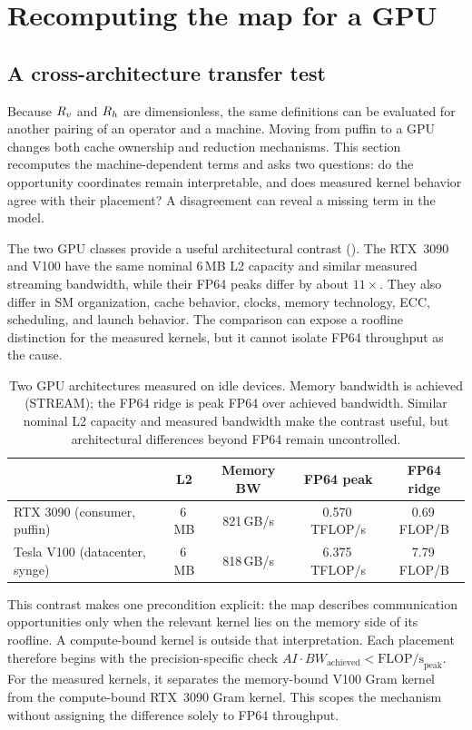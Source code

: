 \section{Recomputing the map for a GPU}\label{sec:gpu}

\subsection{A cross-architecture transfer test}

Because $R_v$ and $R_h$ are dimensionless, the same definitions can be evaluated for another pairing of an operator and a machine. Moving from puffin to a GPU changes both cache ownership and reduction mechanisms. This section recomputes the machine-dependent terms and asks two questions: do the opportunity coordinates remain interpretable, and does measured kernel behavior agree with their placement? A disagreement can reveal a missing term in the model.

The two GPU classes provide a useful architectural contrast (). The RTX~3090 and V100 have the same nominal 6\,MB L2 capacity and similar measured streaming bandwidth, while their FP64 peaks differ by about $11\times$. They also differ in SM organization, cache behavior, clocks, memory technology, ECC, scheduling, and launch behavior. The comparison can expose a roofline distinction for the measured kernels, but it cannot isolate FP64 throughput as the cause.

\begin{table}[htbp!]
\centering
\caption{Two GPU architectures measured on idle devices. Memory bandwidth is achieved (STREAM); the FP64 ridge is peak FP64 over achieved bandwidth. Similar nominal L2 capacity and measured bandwidth make the contrast useful, but architectural differences beyond FP64 remain uncontrolled.}
\label{tab:gpus}
\begin{tabular}{@{}lcccc@{}}
\toprule
 & \textbf{L2} & \textbf{Memory BW} & \textbf{FP64 peak} & \textbf{FP64 ridge} \\
\midrule
RTX 3090 (consumer, puffin)      & 6\,MB & 821\,GB/s & 0.570\,TFLOP/s & 0.69\,FLOP/B \\
Tesla V100 (datacenter, synge)   & 6\,MB & 818\,GB/s & 6.375\,TFLOP/s & 7.79\,FLOP/B \\
\bottomrule
\end{tabular}
\end{table}

This contrast makes one precondition explicit: the map describes communication opportunities only when the relevant kernel lies on the memory side of its roofline. A compute-bound kernel is outside that interpretation. Each placement therefore begins with the precision-specific check $AI\cdot BW_{\text{achieved}}<\text{FLOP/s}_{\text{peak}}$. For the measured kernels, it separates the memory-bound V100 Gram kernel from the compute-bound RTX~3090 Gram kernel. This scopes the mechanism without assigning the difference solely to FP64 throughput.

